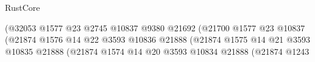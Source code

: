 \begin{lexlean}{RustCore}
\begin{coremodule}
                                                                  (@32053
                                                                    @1577
                                                                    @23
                                                                    @2745
                                                                    @10837
                                                                    @9380
                                                                    @21692
                                                                    (@21700
                                                                      @1577
                                                                      @23
                                                                      @10837
                                                                      (@21874
                                                                        @1576
                                                                        @14
                                                                        @22
                                                                        @3593
                                                                        @10836
                                                                        @21888
                                                                        (@21874
                                                                          @1575
                                                                          @14
                                                                          @21
                                                                          @3593
                                                                          @10835
                                                                          @21888
                                                                          (@21874
                                                                            @1574
                                                                            @14
                                                                            @20
                                                                            @3593
                                                                            @10834
                                                                            @21888
                                                                            (@21874
                                                                              @1243

\end{coremodule}
\end{lexlean}
